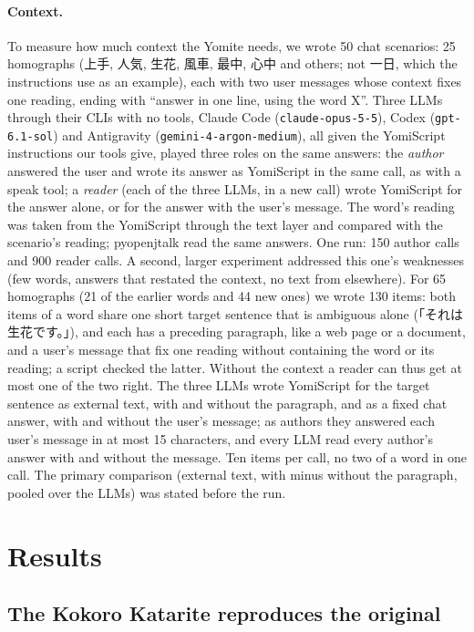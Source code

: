 \documentclass[11pt,a4paper]{article}
\begin{document}
\paragraph{Context.} To measure how much context the Yomite needs, we wrote 50 chat scenarios: 25 homographs (上手,
人気, 生花, 風車, 最中, 心中 and others; not 一日, which the instructions use as an example), each with two user messages
whose context fixes one reading, ending with ``answer in one line, using the word X''. Three LLMs through their CLIs
with no tools, Claude Code (\texttt{claude-opus-5-5}), Codex (\texttt{gpt-6.1-sol}) and Antigravity
(\texttt{gemini-4-argon-medium}), all given the YomiScript instructions our tools give, played three roles on the same
answers: the \emph{author} answered the user and wrote its answer as YomiScript in the same call, as with a speak
tool; a \emph{reader} (each of the three LLMs, in a new call) wrote YomiScript for the answer alone, or for the answer
with the user's message. The word's reading was taken from the YomiScript through the text layer and compared with
the scenario's reading; pyopenjtalk read the same answers. One run: 150 author calls and 900 reader calls.
A second, larger experiment addressed this one's weaknesses (few words, answers that restated the context, no text
from elsewhere). For 65 homographs (21 of the earlier words and 44 new ones) we wrote 130 items: both items of a word
share one short target sentence that is ambiguous alone (「それは生花です。」), and each has a preceding paragraph,
like a web page or a document, and a user's message that fix one reading without containing the word or its reading;
a script checked the latter. Without the context a reader can thus get at most one of the two right. The three LLMs
wrote YomiScript for the target sentence as external text, with and without the paragraph, and as a fixed chat answer,
with and without the user's message; as authors they answered each user's message in at most 15 characters, and every
LLM read every author's answer with and without the message. Ten items per call, no two of a word in one call. The
primary comparison (external text, with minus without the paragraph, pooled over the LLMs) was stated before the
run.

\section{Results}\label{sec:results}

\subsection{The Kokoro Katarite reproduces the original}\label{sec:parity}
\end{document}
